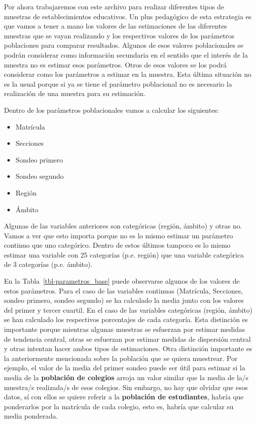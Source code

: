 \documentclass[
  spanish,
  a4paper,
]{scrreprt}
\begin{document}
Por ahora trabajaremos con este archivo para realizar diferentes tipos
de muestras de establecimientos educativos. Un plus pedagógico de esta
estrategia es que vamos a tener a mano los valores de las estimaciones
de las diferentes muestras que se vayan realizando y los respectivos
valores de los parámetros poblaciones para comparar resultados. Algunos
de esos valores poblacionales se podrán considerar como información
secundaria en el sentido que el interés de la muestra no es estimar esos
parámetros. Otros de esos valores se los podrá considerar como los
parámetros a estimar en la muestra. Esta última situación no es la usual
porque si ya se tiene el parámetro poblacional no es necesario la
realización de una muestra para su estimación.

Dentro de los parámetros poblacionales vamos a calcular los siguientes:

\begin{itemize}
\item
  Matrícula
\item
  Secciones
\item
  Sondeo primero
\item
  Sondeo segundo
\item
  Región
\item
  Ámbito
\end{itemize}

\noindent Algunas de las variables anteriores son categóricas (región,
ámbito) y otras no. Vamos a ver que esto importa porque no es lo mismo
estimar un parámetro continuo que uno categórico. Dentro de estos
últimos tampoco es lo mismo estimar una variable con 25 categorías (p.e.
región) que una variable categórica de 3 categorías (p.e. ámbito).

En la Tabla~\ref{tbl-parametros_base} puede observarse algunos de los
valores de estos parámetros. Para el caso de las variables continuas
(Matrícula, Secciones, sondeo primero, sondeo segundo) se ha calculado
la media junto con los valores del primer y tercer cuartil. En el caso
de las variables categóricas (región, ámbito) se han calculado los
respectivos porcentajes de cada categoría. Esta distinción es importante
porque mientras algunas muestras se esfuerzan por estimar medidas de
tendencia central, otras se esfuerzan por estimar medidas de dispersión
central y otras intentan hacer ambos tipos de estimaciones. Otra
distinción importante es la anteriormente mencionada sobre la población
que se quiera muestrear. Por ejemplo, el valor de la media del primer
sondeo puede ser útil para estimar si la media de la \textbf{población
de colegios} arroja un valor similar que la media de la/s muestra/s
realizada/s de esos colegios. Sin embargo, no hay que olvidar que esos
datos, sí con ellos se quiere referir a la \textbf{población de
estudiantes}, habría que ponderarlos por la matrícula de cada colegio,
esto es, habría que calcular su media ponderada.
\end{document}
